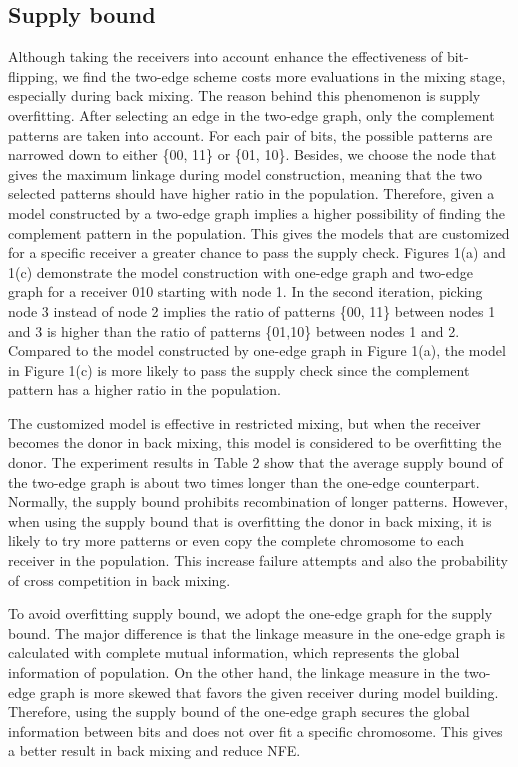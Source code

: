 \documentclass{sig-alternate-05-2015}
\begin{document}
\subsection{Supply bound}
Although taking the receivers into account enhance the effectiveness of bit-flipping, we find the two-edge scheme costs more evaluations in the mixing stage, especially during back mixing. The reason behind this phenomenon is supply overfitting. After selecting an edge in the two-edge graph, only the complement patterns are taken into account. For each pair of bits, the possible patterns are narrowed down to either \{00, 11\} or \{01, 10\}. Besides, we choose the node that gives the maximum linkage during model construction, meaning that the two selected patterns should have higher ratio in the population. Therefore, given a model constructed by a two-edge graph implies a higher possibility of finding the complement pattern in the population. This gives the models that are customized for a specific receiver a greater chance to pass the supply check. Figures 1(a) and 1(c) demonstrate the model construction with one-edge graph and two-edge graph for a receiver 010 starting with node 1. In the second iteration, picking node 3 instead of node 2 implies the ratio of patterns \{00, 11\} between nodes 1 and 3 is higher than the ratio of patterns \{01,10\} between nodes 1 and 2. Compared to the model constructed by one-edge graph in Figure 1(a), the model in Figure 1(c) is more likely to pass the supply check since the complement pattern has a higher ratio in the population. 

The customized model is effective in restricted mixing, but when the receiver becomes the donor in back mixing, this model is considered to be overfitting the donor. The experiment results in Table 2 show that the average supply bound of the two-edge graph is about two times longer than the one-edge counterpart. Normally, the supply bound prohibits recombination of longer patterns. However, when using the supply bound that is overfitting the donor in back mixing, it is likely to try more patterns or even copy the complete chromosome to each receiver in the population. This increase failure attempts and also the probability of cross competition in back mixing. 

To avoid overfitting supply bound, we adopt the one-edge graph for the supply bound. The major difference is that the linkage measure in the one-edge graph is calculated with complete mutual information, which represents the global information of population. On the other hand, the linkage measure in the two-edge graph is more skewed that favors the given receiver during model building. Therefore, using the supply bound of the one-edge graph secures the global information between bits and does not over fit a specific chromosome. This gives a better result in back mixing and reduce NFE.
\end{document}
